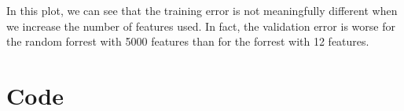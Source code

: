 \documentclass[12pt]{article}
\begin{document}
\begin{enumerate}
    In this plot, we can see that the training error is not meaningfully different when we increase the number of features
    used.  In fact, the validation error is worse for the random forrest with 5000 features than for the forrest with 12 
    features.
\end{enumerate}

\newpage
\newpage
\appendix
\section*{Code}

\end{document}
